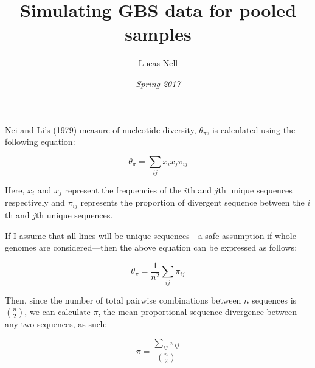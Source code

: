 



\title{\vspace*{-3ex}Simulating GBS data for pooled samples}
\author{Lucas Nell}
\date{\vspace*{-3ex}\emph{Spring 2017}}



\maketitle



\raggedright

Nei and Li's (1979) measure of nucleotide diversity, $\theta_{\pi}$, is calculated using
the following equation:

\begin{equation} \label{eq_neili}
    \theta_\pi = \sum_{ij} x_i x_j \pi_{ij}
\end{equation}

Here, $x_i$ and $x_j$ represent the frequencies of the $i$th and $j$th unique 
sequences respectively and 
$\pi_{ij}$ represents the proportion of divergent sequence between the $i$th and 
$j$th unique sequences.

If I assume that all lines will be unique sequences—a safe assumption if whole 
genomes are considered—then the above equation can be expressed as follows:

\begin{equation} \label{eq_unqseq}
    \theta_\pi = \frac{1}{n^2} \sum_{ij} \pi_{ij}
\end{equation}

Then, since the number of total pairwise combinations between $n$ sequences is 
$\binom{n}{2}$, we can calculate $\bar{\pi}$, the mean proportional
sequence divergence between any two sequences, as such:



\begin{equation} \label{eq_barpi}
    \bar{\pi} = \frac{ \sum_{ij} \pi_{ij} }{ \binom{n}{2} }
\end{equation}


